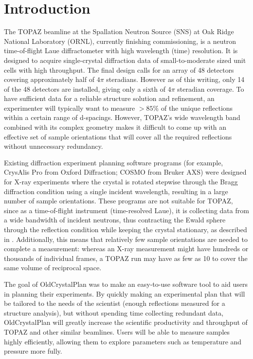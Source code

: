 \documentclass[final]{iucr}              %
\begin{document}
\section{Introduction}

The TOPAZ beamline at the Spallation Neutron Source (SNS) at Oak Ridge National
Laboratory (ORNL), currently finishing commissioning, is a neutron
time-of-flight Laue diffractometer with high wavelength (time) resolution. It
is designed to acquire single-crystal diffraction data of small-to-moderate sized unit cells with  high
throughput. The final design calls for an array of 48 detectors covering
approximately half of $4\pi$ steradians. However as of this writing, only 14 of
the 48 detectors are installed, giving only a sixth of $4\pi$ steradian
coverage. To have sufficient data for a reliable structure solution and  
refinement, an experimenter will typically want to measure $ > 85\%$ of the
unique reflections within a certain range of d-spacings. However, TOPAZ's wide 
wavelength band combined with its complex geometry makes it difficult to come up
with  an effective set of sample orientations that will cover all the required
reflections without unnecessary redundancy. 


Existing diffraction experiment planning software programs (for example,
CrysAlis Pro from Oxford Diffraction; COSMO from Bruker AXS) were designed for
X-ray experiments where the crystal is rotated stepwise through the Bragg
diffraction condition using a single incident wavelength, 
resulting in a large number of sample orientations.
These programs are not suitable for TOPAZ, since as a time-of-flight instrument
(time-resolved Laue), it is collecting data from a wide
bandwidth of incident neutrons, thus contracting the Ewald sphere through the
reflection condition while keeping the crystal stationary, as described in
\cite{Schultz94,Wilson00}.
 Additionally, this means that relatively few sample
orientations are needed to complete a measurement: whereas an X-ray measurement might have
hundreds or thousands of individual frames, a TOPAZ run may have as few as 10
to cover the same volume of reciprocal space.


The goal of OldCrystalPlan was to make an easy-to-use software tool to aid users in
planning their experiments. By quickly making an experimental plan that will be
tailored to the needs of the scientist (enough reflections measured for a structure
analysis), but without spending time collecting redundant data, OldCrystalPlan will
greatly increase the scientific productivity and throughput of TOPAZ and other
similar beamlines. Users will be able to measure samples highly efficiently,
allowing them to explore parameters such as temperature and pressure more fully.
 
\end{document}
